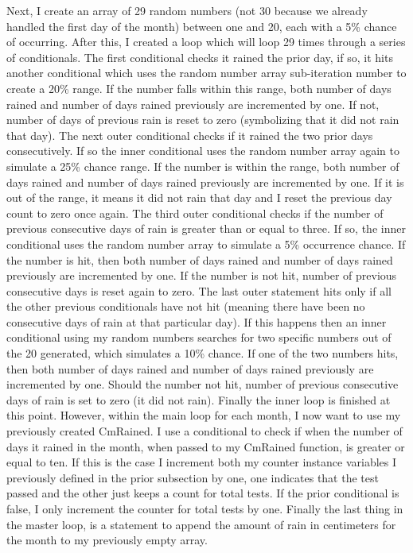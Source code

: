 \documentclass[twocolumn]{revtex4}
\begin{document}
Next, I create an array of 29 random numbers (not 30 because we already handled the first day of the month) between one and 20, each with a 5\% chance of occurring. After this, I created a loop which will loop 29 times through a series of conditionals. The first conditional checks it rained the prior day, if so, it hits another conditional which uses the random number array sub-iteration number to create a 20\% range. If the number falls within this range, both number of days rained and number of days rained previously are incremented by one. If not, number of days of previous rain is reset to zero (symbolizing that it did not rain that day). The next outer conditional checks if it rained the two prior days consecutively. If so the inner conditional uses the random number array again to simulate a 25\% chance range. If the number is within the range, both number of days rained and number of days rained previously are incremented by one. If it is out of the range, it means it did not rain that day and I reset the previous day count to zero once again. The third outer conditional checks if the number of previous consecutive days of rain is greater than or equal to three. If so, the inner conditional uses the random number array to simulate a 5\% occurrence chance. If the number is hit, then both number of days rained and number of days rained previously are incremented by one. If the number is not hit, number of previous consecutive days is reset again to zero. The last outer statement hits only if all the other previous conditionals have not hit (meaning there have been no consecutive days of rain at that particular day). If this happens then an inner conditional using my random numbers searches for two specific numbers out of the 20 generated, which simulates a 10\% chance. If one of the two numbers hits, then both number of days rained and number of days rained previously are incremented by one. Should the number not hit, number of previous consecutive days of rain is set to zero (it did not rain). Finally the inner loop is finished at this point. However, within the main loop for each month, I now want to use my previously created CmRained. I use a conditional to check if when the number of days it rained in the month, when passed to my CmRained function, is greater or equal to ten. If this is the case I increment both my counter instance variables I previously defined in the prior subsection by one, one indicates that the test passed and the other just keeps a count for total tests. If the prior conditional is false, I only increment the counter for total tests by one. Finally the last thing in the master loop, is a statement to append the amount of rain in centimeters for the month to my previously empty array.
\end{document}
